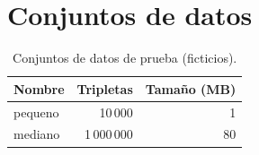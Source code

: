 \chapter{Conjuntos de datos}
\begin{table}[H]
  \centering
  \begin{tabular}{@{}lrr@{}}
    \toprule
    \textbf{Nombre} & \textbf{Tripletas} & \textbf{Tamaño (MB)} \\
    \midrule
    pequeno & 10\,000     &  1 \\
    mediano & 1\,000\,000 & 80 \\
    \bottomrule
  \end{tabular}
  \caption{Conjuntos de datos de prueba (ficticios).}
  \label{tab:datos}
\end{table}
